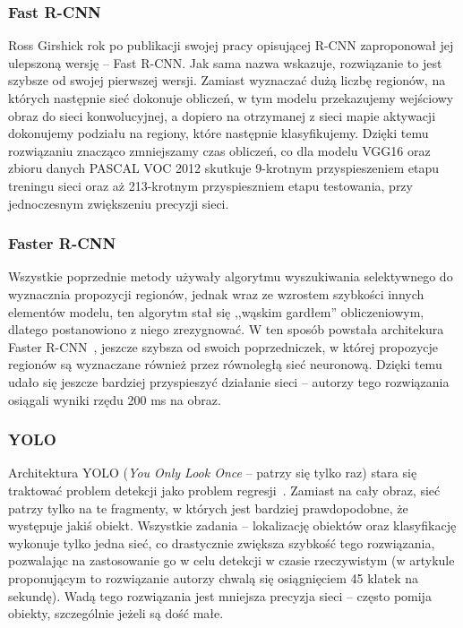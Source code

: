 \documentclass[a4paper,twoside,12pt]{book}
\newcommand{\obcy}[1]{\emph{#1}}
\newcommand{\ang}[1]{{\selectlanguage{british}\obcy{#1}}}
\begin{document}
{\subsubsection{Fast R-CNN}
{Ross Girshick rok po publikacji swojej pracy opisującej R-CNN zaproponował jej ulepszoną wersję – Fast R-CNN\cite{girshick2015fast}. Jak sama nazwa wskazuje, rozwiązanie to jest szybsze od swojej pierwszej wersji. Zamiast wyznaczać dużą liczbę regionów, na których następnie sieć dokonuje obliczeń, w tym modelu przekazujemy wejściowy obraz do sieci konwolucyjnej, a dopiero na otrzymanej z sieci mapie aktywacji dokonujemy podziału na regiony, które następnie klasyfikujemy. Dzięki temu rozwiązaniu znacząco zmniejszamy czas obliczeń, co dla modelu VGG16 oraz zbioru danych PASCAL VOC 2012 skutkuje 9-krotnym przyspieszeniem etapu treningu sieci oraz aż 213-krotnym przyspieszniem etapu testowania, przy jednoczesnym zwiększeniu precyzji sieci.}
\subsubsection{Faster R-CNN}
{Wszystkie poprzednie metody używały algorytmu wyszukiwania selektywnego do wyznacznia propozycji regionów, jednak wraz ze wzrostem szybkości innych elementów modelu, ten algorytm stał się ,,wąskim gardłem'' obliczeniowym, dlatego postanowiono z niego zrezygnować. W ten sposób powstała architekura Faster R-CNN~\cite{ren2015faster}, jeszcze szybsza od swoich poprzedniczek, w której propozycje regionów są wyznaczane również przez równoległą sieć neuronową. Dzięki temu udało się jeszcze bardziej przyspieszyć działanie sieci – autorzy tego rozwiązania osiągali wyniki rzędu 200 ms na obraz.}
\subsubsection{YOLO}
{Architektura YOLO (\ang{You Only Look Once} – patrzy się tylko raz) stara się traktować problem detekcji jako problem regresji~\cite{redmon2016you}. Zamiast na cały obraz, sieć patrzy tylko na te fragmenty, w których jest bardziej prawdopodobne, że występuje jakiś obiekt. Wszystkie zadania – lokalizację obiektów oraz klasyfikację wykonuje tylko jedna sieć, co drastycznie zwiększa szybkość tego rozwiązania, pozwalając na zastosowanie go w celu detekcji w czasie rzeczywistym (w artykule proponującym to rozwiązanie autorzy chwalą się osiągnięciem 45 klatek na sekundę). Wadą tego rozwiązania jest mniejsza precyzja sieci – często pomija obiekty, szczególnie jeżeli są dość małe.}


}
\end{document}
